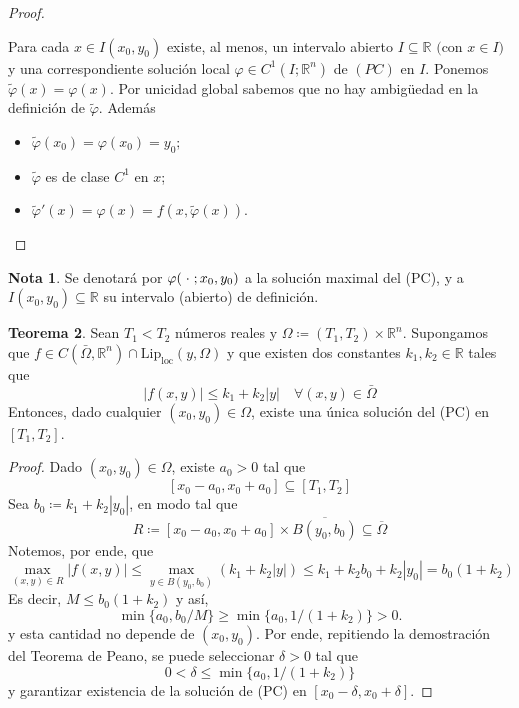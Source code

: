 \documentclass[11pt]{article}
\theoremstyle{definition} %
\newtheorem{theorem}{Teorema}[section]
\newtheorem{note}[theorem]{Nota}
\newcommand{\R}{\mathbb{R}}
\begin{document}
\begin{proof}
\begin{enumerate}
      Para cada $x \in I(x_0, y_0)$ existe, al menos, un intervalo abierto $I \subseteq \mathbb{R}$ $($con $x \in I)$ y una correspondiente solución local $\varphi \in C^1(I;\R^n)$ de $(PC)$ en $I$. Ponemos $\tilde{\varphi}(x) = \varphi(x)$. Por unicidad global sabemos que no hay ambigüedad en la definición de $\tilde{\varphi}$. Además
      \begin{itemize}
          \item $\tilde{\varphi}(x_0) = \varphi(x_0) = y_0;$
          \item $\tilde{\varphi}$ es de clase $C^1$ en $x$;
          \item $\tilde{\varphi}'(x) = \varphi(x) = f(x, \tilde{\varphi}(x))$.
      \end{itemize}
  \end{enumerate}
\end{proof}

\begin{note}
  Se denotará por $\varphi(\hspace{1mm} \cdot\hspace{1mm}; x_0, y_0)$ a la solución maximal del (PC), y a $I(x_0, y_0) \subseteq \mathbb{R}$ su intervalo (abierto) de definición.
\end{note}

\begin{theorem} 
  Sean $T_1 < T_2$ números reales y $\Omega \coloneqq (T_1, T_2) \times \mathbb{R}^n$. Supongamos que $f \in C(\bar{\Omega}, \mathbb{R}^n) \cap \text{Lip}_{\text{loc}}(y, \Omega)$ y que existen dos constantes $k_1, k_2 \in \mathbb{R}$ tales que
  \[ |f(x,y)| \leq k_1 + k_2|y| \quad \forall (x,y) \in \bar{\Omega} \]
  Entonces, dado cualquier $(x_0, y_0) \in \Omega$, existe una única solución del (PC) en $[T_1, T_2]$.
\end{theorem}

\begin{proof}
  Dado $(x_0, y_0) \in \Omega$, existe $a_0 > 0$ tal que
  \[ [x_0 - a_0, x_0 + a_0] \subseteq [T_1, T_2] \]
  Sea $b_0 \coloneqq k_1 + k_2|y_0|$, en modo tal que
  \[ R \coloneqq [x_0 - a_0, x_0 + a_0] \times \overline{B(y_0, b_0)} \subseteq \overline{\Omega} \]
  Notemos, por ende, que
  \[ \max_{(x,y) \in R} |f(x,y)| \leq \max_{y \in {B}(y_0, b_0)} (k_1 + k_2|y|) \leq k_1 + k_2b_0 + k_2|y_0| = b_0(1+k_2) \]
  Es decir, $M \leq b_0(1+k_2)$ y así,
  \[ \min\{a_0, b_0/M\} \geq \min\{a_0, 1/(1+k_2)\} > 0. \]
  y esta cantidad no depende de $(x_0, y_0)$. Por ende, repitiendo la demostración del Teorema de Peano, se puede seleccionar $\delta > 0$ tal que
  \[ 0 < \delta \leq \min\{a_0, 1/(1+k_2)\} \]
  y garantizar existencia de la solución de (PC) en $[x_0 - \delta, x_0 + \delta]$.
\end{proof}
\end{document}
